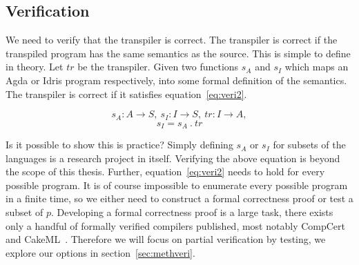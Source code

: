 \subsection{Verification}\label{sec:veri}

We need to verify that the transpiler is correct. The transpiler is correct if
the transpiled program has the same semantics as the source.
This is simple to define in theory.
Let $tr$ be the transpiler.
Given two functions $s_A$ and $s_I$ which maps an Agda or Idris program
respectively, into some formal definition of the semantics.
The transpiler is correct if it satisfies equation~\ref{eq:veri2}.

\begin{equation} \label{eq:veri1}
  s_A : A \rightarrow S,
  \ s_I : I \rightarrow S,
  \ tr : I \rightarrow A,
\end{equation}
\begin{equation} \label{eq:veri2}
  s_I = s_A\ .\ tr
\end{equation}

Is it possible to show this is practice? 
Simply defining $s_A$ or $s_I$ for subsets of the languages is a research
project in itself.
Verifying the above equation is beyond the scope of this thesis.
Further, equation~\ref{eq:veri2} needs to hold for every possible program.  It
is of course impossible to enumerate every possible program in a finite time,
so we either need to construct a formal correctness proof or test a subset of
$p$.  Developing a formal correctness proof is a large task, there exists only
a handful of formally verified compilers published, most notably
CompCert~\cite{compcert} and CakeML~\cite{cakeml}.
Therefore we will focus on partial verification by testing, we explore our
options in section~\ref{sec:methveri}.


